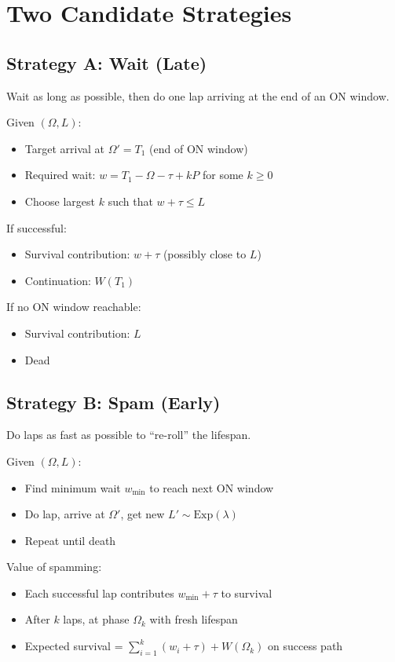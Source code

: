\documentclass{article}
\begin{document}
\section{Two Candidate Strategies}

\subsection{Strategy A: Wait (Late)}

Wait as long as possible, then do one lap arriving at the end of an ON window.

Given $(\Omega, L)$:
\begin{itemize}
    \item Target arrival at $\Omega' = T_1$ (end of ON window)
    \item Required wait: $w = T_1 - \Omega - \tau + kP$ for some $k \geq 0$
    \item Choose largest $k$ such that $w + \tau \leq L$
\end{itemize}

If successful:
\begin{itemize}
    \item Survival contribution: $w + \tau$ (possibly close to $L$)
    \item Continuation: $W(T_1)$
\end{itemize}

If no ON window reachable:
\begin{itemize}
    \item Survival contribution: $L$
    \item Dead
\end{itemize}

\subsection{Strategy B: Spam (Early)}

Do laps as fast as possible to ``re-roll'' the lifespan.

Given $(\Omega, L)$:
\begin{itemize}
    \item Find minimum wait $w_{\min}$ to reach next ON window
    \item Do lap, arrive at $\Omega'$, get new $L' \sim \text{Exp}(\lambda)$
    \item Repeat until death
\end{itemize}

Value of spamming:
\begin{itemize}
    \item Each successful lap contributes $w_{\min} + \tau$ to survival
    \item After $k$ laps, at phase $\Omega_k$ with fresh lifespan
    \item Expected survival = $\sum_{i=1}^{k}(w_i + \tau) + W(\Omega_k)$ on success path
\end{itemize}
\end{document}
